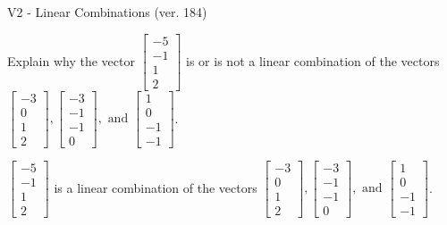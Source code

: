 \begin{exercise}
  \begin{exerciseTitle}V2 - Linear Combinations (ver. 184)\end{exerciseTitle}
  \begin{exerciseStatement}
    Explain why the vector \(\left[\begin{array}{c}
-5 \\
-1 \\
1 \\
2
\end{array}\right]\)  is or is not a linear 
	combination of the vectors \(\left[\begin{array}{c}
-3 \\
0 \\
1 \\
2
\end{array}\right] , \left[\begin{array}{c}
-3 \\
-1 \\
-1 \\
0
\end{array}\right] , \text{ and } \left[\begin{array}{c}
1 \\
0 \\
-1 \\
-1
\end{array}\right]\).
	


  \end{exerciseStatement}
  \begin{exerciseAnswer}
   \(\left[\begin{array}{c}
-5 \\
-1 \\
1 \\
2
\end{array}\right]\) 
  	 is  
	a linear combination of the vectors \(\left[\begin{array}{c}
-3 \\
0 \\
1 \\
2
\end{array}\right] , \left[\begin{array}{c}
-3 \\
-1 \\
-1 \\
0
\end{array}\right] , \text{ and } \left[\begin{array}{c}
1 \\
0 \\
-1 \\
-1
\end{array}\right]\).

	
  


  \end{exerciseAnswer}
\end{exercise}